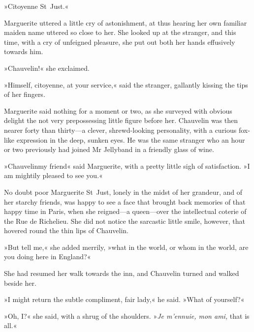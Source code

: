 »Citoyenne St~Just.«

Marguerite uttered a little cry of astonishment, at thus hearing her own familiar maiden name uttered so close to her. She looked up at the stranger, and this time, with a cry of unfeigned pleasure, she put out both her hands effusively towards him.

»Chauvelin!« she exclaimed.

»Himself, citoyenne, at your service,« said the stranger, gallantly kissing the tips of her fingers.

Marguerite said nothing for a moment or two, as she surveyed with obvious delight the not very prepossessing little figure before her. Chauvelin was then nearer forty than thirty—a clever, shrewd-looking personality, with a curious fox-like expression in the deep, sunken eyes. He was the same stranger who an hour or two previously had joined Mr Jellyband in a friendly glass of wine.

»Chauvelin\textellipsis \allowbreak  my friend\textellipsis« said Marguerite, with a pretty little sigh of satisfaction. »I am mightily pleased to see you.«

No doubt poor Marguerite St~Just, lonely in the midst of her grandeur, and of her starchy friends, was happy to see a face that brought back memories of that happy time in Paris, when she reigned—a queen—over the intellectual coterie of the Rue de Richelieu. She did not notice the sarcastic little smile, however, that hovered round the thin lips of Chauvelin.

»But tell me,« she added merrily, »what in the world, or whom in the world, are you doing here in England?«

She had resumed her walk towards the inn, and Chauvelin turned and walked beside her.

»I might return the subtle compliment, fair lady,« he said. »What of yourself?«

»Oh, I?« she said, with a shrug of the shoulders. »\textit{Je m'ennuie, mon ami,} that is all.«

